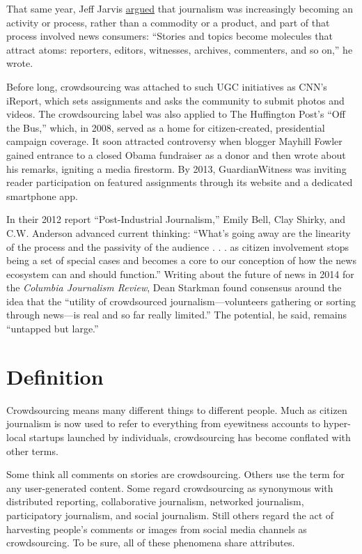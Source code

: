 \documentclass[notoc, symmetric, nobib, nols]{towcenter-guideto-book}
\begin{document}
That same year, Jeff Jarvis \href{http://buzzmachine.com/2008/04/14/the-press-becomes-the-press-sphere/}{argued} that journalism was increasingly becoming an activity or process, rather than a commodity or a product, and part of that process involved news consumers: ``Stories and topics become molecules that attract atoms: reporters, editors, witnesses, archives, commenters, and so on,'' he wrote.\autocite{Jarvis}

Before long, crowdsourcing was attached to such UGC initiatives as CNN's iReport, which sets assignments and asks the community to submit photos and videos. The crowdsourcing label was also applied to The Huffington Post's ``Off the Bus,'' which, in 2008, served as a home for citizen-created, presidential campaign coverage. It soon attracted controversy when blogger Mayhill Fowler gained entrance to a closed Obama fundraiser as a donor and then wrote about his remarks, igniting a media firestorm. By 2013, GuardianWitness was inviting reader participation on featured assignments through its website and a dedicated smartphone app. 

In their 2012 report ``Post-Industrial Journalism,'' Emily Bell, Clay Shirky, and C.W. Anderson advanced current thinking: ``What's going away are the linearity of the process and the passivity of the audience . . . as citizen involvement stops being a set of special cases and becomes a core to our conception of how the news ecosystem can and should function.''\autocite{Tow}
Writing about the future of news in 2014 for the \textit{Columbia Journalism Review}, Dean Starkman found consensus around the idea that the ``utility of crowdsourced journalism---volunteers gathering or sorting through news---is real and so far really limited.'' The potential, he said, remains ``untapped but large.''\autocite{CJR}

\section{Definition}  

Crowdsourcing means many different things to different people. Much as citizen journalism is now used to refer to everything from eyewitness accounts to hyper-local startups launched by individuals, crowdsourcing has become conflated with other terms.

Some think all comments on stories are crowdsourcing. Others use the term for any user-generated content. Some regard crowdsourcing as synonymous with distributed reporting, collaborative journalism, networked journalism, participatory journalism, and social journalism. Still others regard the act of harvesting people's comments or images from social media channels as crowdsourcing. To be sure, all of these phenomena share attributes.
\end{document}
